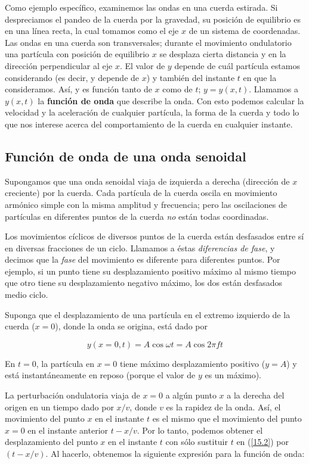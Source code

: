Como ejemplo específico, examinemos las ondas en una cuerda estirada. Si despreciamos el pandeo de la cuerda por la gravedad, su posición de equilibrio es en una línea recta, la cual tomamos como el eje $x$ de un sistema de coordenadas. Las ondas en una cuerda son transversales; durante el movimiento ondulatorio una partícula con posición de equilibrio $x$ se desplaza cierta distancia y en la dirección perpendicular al eje $x$. El valor de $y$ depende de cuál partícula estamos considerando (es decir, y depende de $x$) y también del instante $t$ en que la consideramos. Así, y es función tanto de $x$ como de $t$; $y = y(x, t)$. Llamamos a $y(x, t)$ la \textbf{función de onda} que describe la onda. Con esto podemos calcular la velocidad y la aceleración de cualquier partícula, la forma de la cuerda y todo lo que nos interese acerca del comportamiento de la cuerda en cualquier instante.

\subsection{Función de onda de una onda senoidal}
Supongamos que una onda senoidal viaja de izquierda a derecha (dirección de $x$ creciente) por la cuerda. Cada partícula de la cuerda oscila en movimiento armónico simple con la misma amplitud y frecuencia; pero las oscilaciones de partículas en diferentes puntos de la cuerda \textit{no} están todas coordinadas. 

Los movimientos cíclicos de diversos puntos de la cuerda están desfasados entre sí en diversas fracciones de un ciclo. Llamamos a éstas \textit{diferencias de fase}, y decimos que la \textit{fase} del movimiento es diferente para diferentes puntos. Por ejemplo, si un punto tiene su desplazamiento positivo máximo al mismo tiempo que otro tiene su desplazamiento negativo máximo, los dos están desfasados medio ciclo.

Suponga que el desplazamiento de una partícula en el extremo izquierdo de la cuerda ($x = 0$), donde la onda se origina, está dado por

\begin{equation}\label{15.2}
y(x=0,t)=A\cos\omega t=A\cos 2\pi ft
\end{equation}

En $t = 0$, la partícula en $x =0$ tiene máximo desplazamiento positivo ($y = A$) y está instantáneamente en reposo (porque el valor de $y$ es un máximo).

La perturbación ondulatoria viaja de $x = 0$ a algún punto $x$ a la derecha del origen en un tiempo dado por $x/v$, donde $v$ es la rapidez de la onda. Así, el movimiento del punto $x$ en el instante $t$ es el mismo que el movimiento del punto $x = 0$ en el instante anterior $t - x/v$. Por lo tanto, podemos obtener el desplazamiento del punto $x$ en el instante $t$ con sólo sustituir $t$ en (\ref{15.2}) por $(t - x/v)$. Al hacerlo, obtenemos la siguiente expresión para la función de onda:

